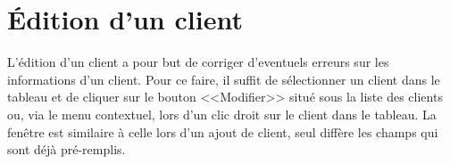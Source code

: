 \section{Édition d'un client}
L’édition d’un client a pour but de corriger d’eventuels erreurs sur les informations d’un client. Pour ce faire, il suffit de sélectionner
un client dans le tableau et de cliquer sur le bouton <<Modifier>> situé sous la liste des clients ou, via le menu contextuel, lors d’un clic
droit sur le client dans le tableau. 
 La fenêtre est similaire à celle lors d’un ajout de client, seul diffère les champs qui sont déjà pré-remplis. 

